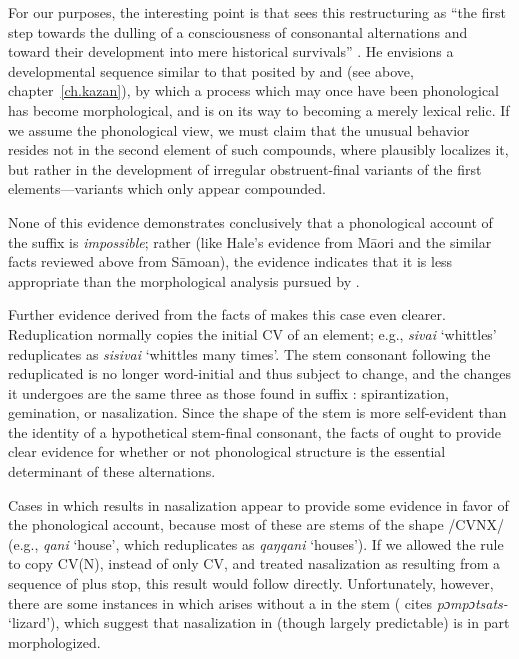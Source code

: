 For our purposes, the interesting point is that {\Sapir} sees this
restructuring as ``the first step towards the dulling of a
consciousness of consonantal alternations and toward their development
into mere historical survivals'' \citep[70]{sapir30:s.paiute}. He
envisions a developmental sequence similar to that posited by 
{\DeCourtenay} and {\Kruszewski} (see above, chapter~\ref{ch.kazan}), by
which a process which may once have been phonological has become
morphological, and is on its way to becoming a merely lexical
relic. If we assume the phonological view, we must claim that the
unusual behavior resides not in the second element of such compounds,
where {\Sapir} plausibly localizes it, but rather in the development of
irregular obstruent-final variants of the first elements—variants
which only appear compounded.

None of this evidence demonstrates conclusively that a phonological
account of the  suffix  is
\emph{impossible}; rather (like Hale's evidence from Māori and the
similar facts reviewed above from Sāmoan), the evidence indicates that
it is less appropriate than the morphological analysis pursued by
{\Sapir}.

Further evidence derived from the facts of  makes
this case even clearer. Reduplication normally copies the initial CV
of an element; e.g., \emph{sivai} `whittles' reduplicates as
\emph{sisivai} `whittles many times'. The stem consonant following the
reduplicated  is no longer word-initial and thus subject to
change, and the changes it undergoes are the same three as those found
in suffix : spirantization, gemination, or
nasalization. Since the shape of the stem is more self-evident than
the identity of a hypothetical stem-final consonant, the facts of
 ought to provide clear evidence for whether or not
phonological structure is the essential determinant of these
alternations.

Cases in which  results in nasalization appear to provide
some evidence in favor of the phonological account, because most of
these are stems of the shape /CVNX/ (e.g., \emph{qani} `house', which
reduplicates as \emph{qaŋqani} `houses'). If we allowed the
 rule to copy CV(N), instead of only CV, and treated
nasalization as resulting from a sequence of  plus
stop, this result would follow directly. Unfortunately, however, there
are some instances in which   arises without a
 in the stem ({\Sapir} cites \emph{pɔmpɔtsats-} `lizard'),
which suggest that nasalization in  (though largely
predictable) is in part morphologized.

